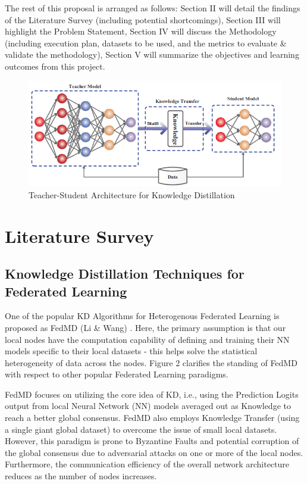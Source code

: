 \documentclass[conference]{IEEEtran}
\begin{document}
The rest of this proposal is arranged as follows: Section II will detail the findings of the Literature Survey (including potential shortcomings), Section III will highlight the Problem Statement, Section IV will discuss the Methodology (including execution plan, datasets to be used, and the metrics to evaluate \& validate the methodology), Section V will summarize the objectives and learning outcomes from this project.
\begin{figure}[htbp]
\centering
\includegraphics[scale=0.5]{Knowledge_Distillation.png}
\caption{Teacher-Student Architecture for Knowledge Distillation \cite{b3}}
\label{fig}
\end{figure}

\section{Literature Survey}
\subsection{Knowledge Distillation Techniques for Federated Learning}
One of the popular KD Algorithms for Heterogenous Federated Learning is proposed as FedMD (Li \& Wang) \cite{b4}. Here, the primary assumption is that our local nodes have the computation capability of defining and training their NN models specific to their local datasets - this helps solve the statistical heterogeneity of data across the nodes. Figure 2 clarifies the standing of FedMD with respect to other popular Federated Learning paradigms.

FedMD focuses on utilizing the core idea of KD, i.e., using the Prediction Logits output from local Neural Network (NN) models averaged out as Knowledge to reach a better global consensus. FedMD also employs Knowledge Transfer (using a single giant global dataset) to overcome the issue of small local datasets. However, this paradigm is prone to Byzantine Faults and potential corruption of the global consensus due to adversarial attacks on one or more of the local nodes. Furthermore, the communication efficiency of the overall network architecture reduces as the number of nodes increases.
\end{document}
